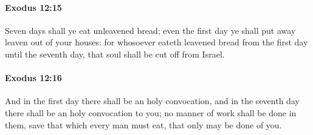 		\paragraph{Exodus 12:15} %
			\label{EXODUS-12-15}

			Seven days shall ye eat unleavened bread; even the first day ye shall put away leaven out of your houses: for whosoever eateth leavened bread from the first day until the seventh day, that soul shall be cut off from Israel.


		\paragraph{Exodus 12:16} %
			\label{EXODUS-12-16}

			And in the first day there shall be an holy convocation, and in the seventh day there shall be an holy convocation to you; no manner of work shall be done in them, save that which every man must eat, that only may be done of you.

